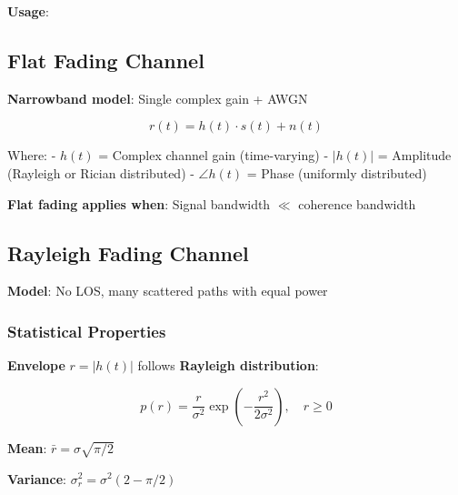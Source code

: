 \textbf{Usage}:

\begin{Shaded}
\begin{Highlighting}[]
\OperatorTok{=}\NormalTok{ np.array([}\OperatorTok{+}\NormalTok{, }\OperatorTok{{-}}\OperatorTok{+}\NormalTok{, }\OperatorTok{+}\NormalTok{, }\OperatorTok{{-}}\OperatorTok{{-}}\NormalTok{])  }
\OperatorTok{=}\OperatorTok{=}\NormalTok{)}
\end{Highlighting}
\end{Shaded}


\subsection{Flat Fading Channel}\label{flat-fading-channel}

\textbf{Narrowband model}: Single complex gain + AWGN

\[
r(t) = h(t) \cdot s(t) + n(t)
\]

Where: - \(h(t)\) = Complex channel gain (time-varying) - \(|h(t)|\) =
Amplitude (Rayleigh or Rician distributed) - \(\angle h(t)\) = Phase
(uniformly distributed)

\textbf{Flat fading applies when}: Signal bandwidth \(\ll\) coherence
bandwidth


\subsection{Rayleigh Fading Channel}\label{rayleigh-fading-channel}

\textbf{Model}: No LOS, many scattered paths with equal power

\subsubsection{Statistical Properties}\label{statistical-properties}

\textbf{Envelope} \(r = |h(t)|\) follows \textbf{Rayleigh distribution}:

\[
p(r) = \frac{r}{\sigma^2} \exp\left(-\frac{r^2}{2\sigma^2}\right), \quad r \geq 0
\]

\textbf{Mean}: \(\bar{r} = \sigma\sqrt{\pi/2}\)

\textbf{Variance}: \(\sigma_r^2 = \sigma^2(2 - \pi/2)\)

